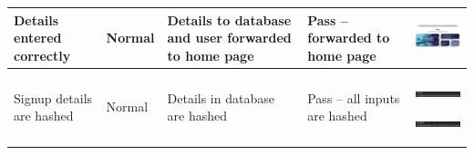\begin{center}
\begin{longtable}{|P{17mm}|P{17mm}|P{16mm}|P{17mm}|P{60mm}|}
Details entered correctly & Normal & Details to database and user
forwarded to home page & Pass -- forwarded to home page &
\includegraphics[width=58mm]{ch3_developing/proto3/media/image6.png} \\ \hline
Signup details are hashed & Normal & Details in database are
hashed & Pass -- all inputs are hashed &
\includegraphics[width=58mm]{ch3_developing/proto3/media/image7.png}

\includegraphics[width=58mm]{ch3_developing/proto3/media/image8.png}


\end{longtable}
\end{center}
